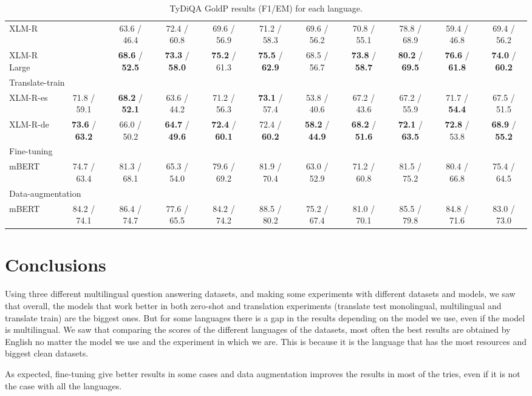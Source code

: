 \documentclass[11pt]{article}
\begin{document}
\begin{table*}[!ht]
\begin{adjustbox}{max width=\textwidth}
\begin{tabular}{l|ccccccccc|c}
        XLM-R & ~ & 63.6 / 46.4 & 72.4 / 60.8 & 69.6 / 56.9 & 71.2 / 58.3 & 69.6 / 56.2 & 70.8 / 55.1 & 78.8 / 68.9 & 59.4 / 46.8 & 69.4 / 56.2 \\
        XLM-R Large & ~ & \textbf{68.6} / \textbf{52.5} & \textbf{73.3} / \textbf{58.0} & \textbf{75.2} / 61.3 & \textbf{75.5} / \textbf{62.9} & 68.5 / 56.7 & \textbf{73.8} / \textbf{58.7} & \textbf{80.2} / \textbf{69.5} & \textbf{76.6} / \textbf{61.8} & \textbf{74.0} / \textbf{60.2}\\
        \midrule
        \multicolumn{11}{l}{Translate-train} \\
        \midrule
        XLM-R-es & 71.8 / 59.1 & \textbf{68.2} / \textbf{52.1} & 63.6 / 44.2 & 71.2 / 56.3 & \textbf{73.1} / 57.4 & 53.8 / 40.6 & 67.2 / 43.6 & 67.2 / 55.9 & 71.7 / \textbf{54.4} & 67.5 / 51.5 \\
        XLM-R-de & \textbf{73.6} / \textbf{63.2} & 66.0 / 50.2 & \textbf{64.7} / \textbf{49.6} & \textbf{72.4} / \textbf{60.1} & 72.4 / \textbf{60.2} & \textbf{58.2} / \textbf{44.9} & \textbf{68.2} / \textbf{51.6} & \textbf{72.1} / \textbf{63.5} & \textbf{72.8} / 53.8 & \textbf{68.9} / \textbf{55.2} \\
        \midrule
        \multicolumn{11}{l}{Fine-tuning} \\
        \midrule
        mBERT & 74.7 / 63.4 & 81.3 / 68.1 & 65.3 / 54.0 & 79.6 / 69.2 & 81.9 / 70.4 & 63.0 / 52.9 & 71.2 / 60.8 & 81.5 / 75.2 & 80.4 / 66.8 & 75.4 / 64.5  \\
        \midrule
        \multicolumn{11}{l}{Data-augmentation} \\
        \midrule
        mBERT & 84.2 / 74.1 & 86.4 / 74.7 & 77.6 / 65.5 & 84.2 / 74.2 & 88.5 / 80.2 & 75.2 / 67.4 & 81.0 / 70.1 & 85.5 / 79.8 & 84.8 / 71.6 & 83.0 / 73.0 \\
        \bottomrule
    \end{tabular}
    \end{adjustbox}
    \centering
    \caption{TyDiQA GoldP results (F1/EM) for each language.}
    \label{TyDiQA_results}
\end{table*}


\section{Conclusions}

Using three different multilingual question answering datasets, and making some experiments with different datasets and models, we saw that overall, the models that work better in both zero-shot and translation experiments (translate test monolingual, multilingual and translate train) are the biggest ones. But for some languages there is a gap in the results depending on the model we use, even if the model is multilingual. We saw that comparing the scores of the different languages of the datasets, most often the best results are obtained by English no matter the model we use and the experiment in which we are. This is because it is the language that has the most resources and biggest clean datasets.

As expected, fine-tuning give better results in some cases and data augmentation improves the results in most of the tries, even if it is not the case with all the languages.





\end{document}
